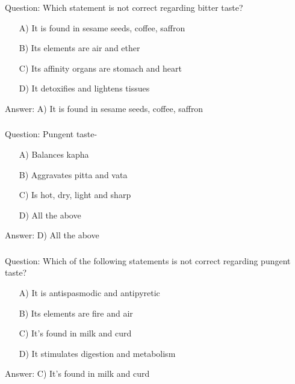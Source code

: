 \begin{frame}[fragile]\frametitle{}

Question: Which statement is not correct regarding bitter taste?

\begin{itemize}
\item[A)] It is found in sesame seeds, coffee, saffron
\item[B)] Its elements are air and ether
\item[C)] Its affinity organs are stomach and heart
\item[D)] It detoxifies and lightens tissues
\end{itemize}

Answer: A) It is found in sesame seeds, coffee, saffron
\end{frame}

\begin{frame}[fragile]\frametitle{}

Question: Pungent taste-

\begin{itemize}
\item[A)] Balances kapha
\item[B)] Aggravates pitta and vata
\item[C)] Is hot, dry, light and sharp
\item[D)] All the above
\end{itemize}

Answer: D) All the above
\end{frame}

\begin{frame}[fragile]\frametitle{}

Question: Which of the following statements is not correct regarding pungent taste?

\begin{itemize}
\item[A)] It is antispasmodic and antipyretic
\item[B)] Its elements are fire and air
\item[C)] It's found in milk and curd
\item[D)] It stimulates digestion and metabolism
\end{itemize}

Answer: C) It's found in milk and curd
\end{frame}

